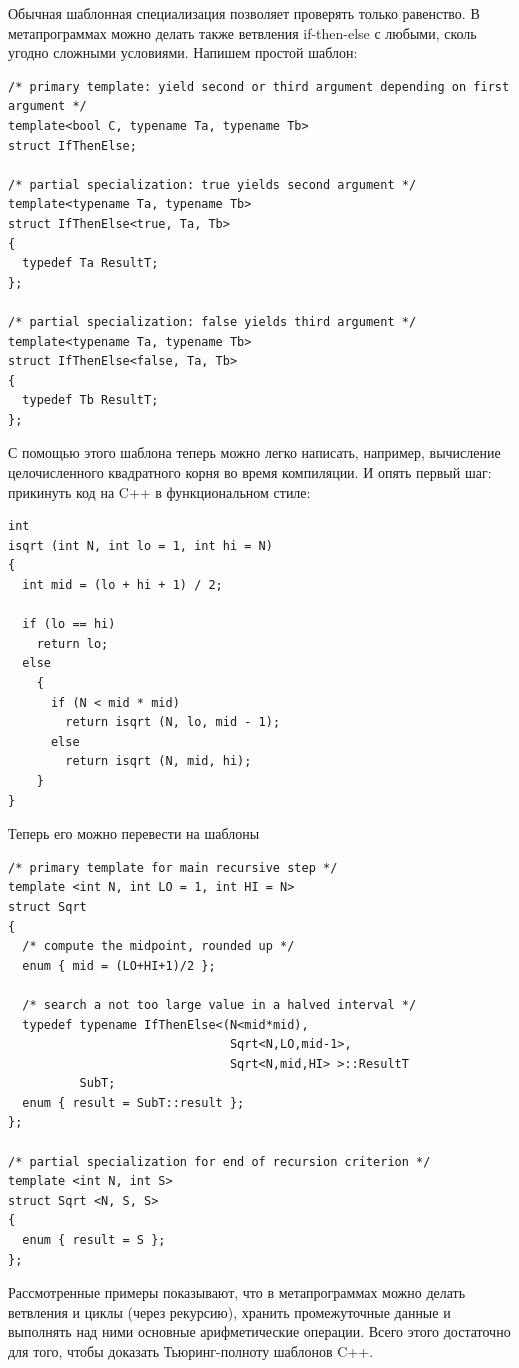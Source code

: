 \documentclass[a4paper,12pt,oneside]{article}
\begin{document}
Обычная шаблонная специализация позволяет проверять только равенство. В метапрограммах можно делать также ветвления if-then-else с любыми, сколь угодно сложными условиями. Напишем простой шаблон:

\begin{lstlisting}
/* primary template: yield second or third argument depending on first argument */
template<bool C, typename Ta, typename Tb> 
struct IfThenElse; 

/* partial specialization: true yields second argument */
template<typename Ta, typename Tb> 
struct IfThenElse<true, Ta, Tb> 
{ 
  typedef Ta ResultT; 
}; 

/* partial specialization: false yields third argument */
template<typename Ta, typename Tb> 
struct IfThenElse<false, Ta, Tb> 
{ 
  typedef Tb ResultT; 
}; 
\end{lstlisting}

С помощью этого шаблона теперь можно легко написать, например, вычисление целочисленного квадратного корня во время компиляции.
И опять первый шаг: прикинуть код на C++ в функциональном стиле:

\begin{lstlisting}
int
isqrt (int N, int lo = 1, int hi = N)
{
  int mid = (lo + hi + 1) / 2;

  if (lo == hi)
    return lo;
  else
    {
      if (N < mid * mid)
        return isqrt (N, lo, mid - 1);
      else
        return isqrt (N, mid, hi);
    }
}
\end{lstlisting}

Теперь его можно перевести на шаблоны

\begin{lstlisting}
/* primary template for main recursive step */
template <int N, int LO = 1, int HI = N> 
struct Sqrt 
{ 
  /* compute the midpoint, rounded up */
  enum { mid = (LO+HI+1)/2 }; 

  /* search a not too large value in a halved interval */
  typedef typename IfThenElse<(N<mid*mid), 
                               Sqrt<N,LO,mid-1>, 
                               Sqrt<N,mid,HI> >::ResultT 
          SubT; 
  enum { result = SubT::result }; 
}; 

/* partial specialization for end of recursion criterion */
template <int N, int S> 
struct Sqrt <N, S, S> 
{ 
  enum { result = S }; 
}; 
\end{lstlisting}

Рассмотренные примеры показывают, что в метапрограммах можно делать ветвления и циклы (через рекурсию), хранить промежуточные данные и выполнять над ними основные арифметические операции. Всего этого достаточно для того, чтобы доказать Тьюринг-полноту шаблонов C++.
\end{document}
